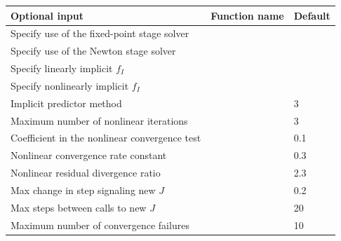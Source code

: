 \documentclass[letterpaper,10pt,english]{sphinxmanual}
\begin{document}
\begin{tabulary}{\linewidth}{|L|L|L|}
\hline
\textbf{\relax 
Optional input
} & \textbf{\relax 
Function name
} & \textbf{\relax 
Default
}\\\hline

Specify use of the fixed-point stage solver
 & 
{\hyperref[c_interface/User_callable:ARKodeSetFixedPoint]{}}
 & 
\\\hline

Specify use of the Newton stage solver
 & 
{\hyperref[c_interface/User_callable:ARKodeSetNewton]{}}
 & 
\\\hline

Specify linearly implicit $f_I$
 & 
{\hyperref[c_interface/User_callable:ARKodeSetLinear]{}}
 & 
\\\hline

Specify nonlinearly implicit $f_I$
 & 
{\hyperref[c_interface/User_callable:ARKodeSetNonlinear]{}}
 & 
\\\hline

Implicit predictor method
 & 
{\hyperref[c_interface/User_callable:ARKodeSetPredictorMethod]{}}
 & 
3
\\\hline

Maximum number of nonlinear iterations
 & 
{\hyperref[c_interface/User_callable:ARKodeSetMaxNonlinIters]{}}
 & 
3
\\\hline

Coefficient in the nonlinear convergence test
 & 
{\hyperref[c_interface/User_callable:ARKodeSetNonlinConvCoef]{}}
 & 
0.1
\\\hline

Nonlinear convergence rate constant
 & 
{\hyperref[c_interface/User_callable:ARKodeSetNonlinCRDown]{}}
 & 
0.3
\\\hline

Nonlinear residual divergence ratio
 & 
{\hyperref[c_interface/User_callable:ARKodeSetNonlinRDiv]{}}
 & 
2.3
\\\hline

Max change in step signaling new $J$
 & 
{\hyperref[c_interface/User_callable:ARKodeSetDeltaGammaMax]{}}
 & 
0.2
\\\hline

Max steps between calls to new $J$
 & 
{\hyperref[c_interface/User_callable:ARKodeSetMaxStepsBetweenLSet]{}}
 & 
20
\\\hline

Maximum number of convergence failures
 & 
{\hyperref[c_interface/User_callable:ARKodeSetMaxConvFails]{}}
 & 
10
\\\hline
\end{tabulary}
\end{document}
